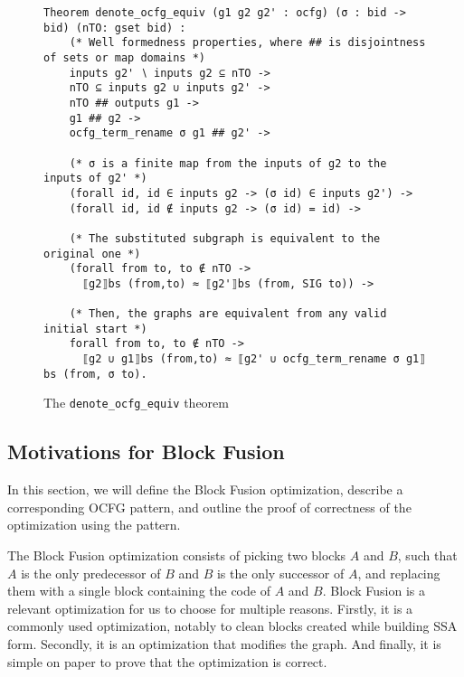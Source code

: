 \documentclass[11pt]{article}
\newcommand{\inlinecoq}[1]{\mbox{\lstinline[style=customcoq,columns=fixed,basewidth=.48em]{#1}}}
\newcommand{\ilc}[1]{\inlinecoq{#1}}
\newcommand{\ocfg}{OCFG\xspace}
\begin{document}


\begin{figure}
\begin{lstlisting}[style=customcoq,basicstyle=\small\ttfamily]
Theorem denote_ocfg_equiv (g1 g2 g2' : ocfg) (σ : bid -> bid) (nTO: gset bid) :
    (* Well formedness properties, where ## is disjointness of sets or map domains *)
    inputs g2' ∖ inputs g2 ⊆ nTO -> 
    nTO ⊆ inputs g2 ∪ inputs g2' -> 
    nTO ## outputs g1 ->
    g1 ## g2 -> 
    ocfg_term_rename σ g1 ## g2' ->

    (* σ is a finite map from the inputs of g2 to the inputs of g2' *)
    (forall id, id ∈ inputs g2 -> (σ id) ∈ inputs g2') ->
    (forall id, id ∉ inputs g2 -> (σ id) = id) ->

    (* The substituted subgraph is equivalent to the original one *)
    (forall from to, to ∉ nTO -> 
      ⟦g2⟧bs (from,to) ≈ ⟦g2'⟧bs (from, SIG to)) ->

    (* Then, the graphs are equivalent from any valid initial start *)
    forall from to, to ∉ nTO ->
      ⟦g2 ∪ g1⟧bs (from,to) ≈ ⟦g2' ∪ ocfg_term_rename σ g1⟧bs (from, σ to).
  \end{lstlisting}
  \caption{The \ilc{denote_ocfg_equiv} theorem}
  \label{fig:ocfg_equiv}
\end{figure}

\subsection{Motivations for Block Fusion}

In this section, we will define the Block Fusion optimization, describe a corresponding \ocfg pattern, and outline the proof of correctness of the optimization using the pattern.

The Block Fusion optimization consists of picking two blocks $A$ and $B$,
such that $A$ is the only predecessor of $B$ and $B$ is the only successor of $A$,
and replacing them with a single block containing the code of $A$ and $B$.
%
Block Fusion is a relevant optimization for us to choose for multiple reasons. Firstly, it is a commonly used optimization, notably to clean blocks created while building SSA form. Secondly, it is an optimization that modifies the graph. And finally, it is simple on paper to prove that the optimization is correct.
\end{document}
